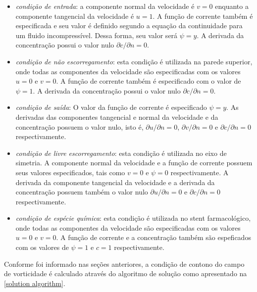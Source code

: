 \begin{itemize}
     \item \textit{condição de entrada}:
      a componente normal da velocidade é $v=0$ enquanto a componente tangencial da velocidade é $u = 1$. 
      A função de corrente também é especificada e seu valor é definido segundo a equação da continuidade 
      para um fluido incompressível. Dessa forma, seu valor será $\psi = y$.
      A derivada da concentração possui o valor nulo $\partial c / \partial n = 0$.


     \item \textit{condição de não escorregamento}: esta condição é utilizada na parede superior, 
      onde todas as componentes da velocidade são especificadas
      com os valores $u=0$ e $v=0$.
      A função de corrente também é especificado com o valor de $\psi=1$. A derivada da concentração
      possui o valor nulo $\partial c / \partial n =0$.

     \item \textit{condição de saída}: O valor da função de corrente é especificado $\psi=y$. As derivadas das
     componentes tangencial e normal da velocidade e da concentração possuem o 
     valor nulo, isto é,
      $\partial u/\partial n = 0$,
      $\partial v/\partial n = 0$ e
      $\partial c / \partial n =0$ respectivamente.

     \item \textit{condição de livre escorregamento}: esta condição é utilizada no eixo de simetria.
      A componente normal da velocidade e a função de corrente possuem seus valores especificados,
      tais como $v=0$ e $\psi=0$ respectivamente. A derivada da componente tangencial da velocidade
      e a derivada da concentração possuem também o valor nulo $\partial u/\partial n = 0$ e 
      $\partial c/\partial n = 0$ respectivamente.

     \item \textit{condição de espécie química}: esta condição é utilizada no stent farmacológico, 
      onde todas as componentes da velocidade são especificadas
      com os valores $u=0$ e $v=0$.
      A função de corrente e a concentração também são espeficados com os valores de $\psi=1$
      e $c=1$ respectivamente.
\end{itemize}

\medskip
\noindent
Conforme foi informado nas seções anteriores, a condição de contono do campo de vorticidade
é calculado através do algoritmo de solução como apresentado na \ref{solution algorithm}.

\newpage
